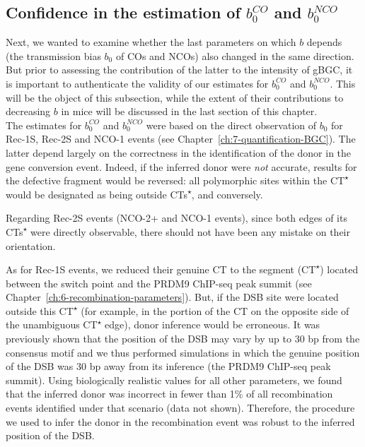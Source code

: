 \subsection{Confidence in the estimation of $b_{0}^{CO}$ and $b_{0}^{NCO}$}

Next, we wanted to examine whether the last parameters on which $b$ depends (the transmission bias $b_0$ of COs and NCOs) also changed in the same direction.
But prior to assessing the contribution of the latter to the intensity of gBGC, it is important to authenticate the validity of our estimates for $b_{0}^{CO}$ and $b_{0}^{NCO}$.
This will be the object of this subsection, while the extent of their contributions to decreasing $b$ in mice will be discussed in the last section of this chapter.\\

The estimates for $b_{0}^{CO}$ and $b_{0}^{NCO}$ were based on the direct observation of $b_0$ for Rec-1S, Rec-2S and NCO-1 events (see Chapter~\ref{ch:7-quantification-BGC}).
The latter depend largely on the correctness in the identification of the donor in the gene conversion event.
Indeed, if the inferred donor were \textit{not} accurate, results for the defective fragment would be reversed: all polymorphic sites within the CT\textsuperscript{$\star$} would be designated as being outside CTs\textsuperscript{$\star$}, and conversely.

Regarding Rec-2S events (NCO-2+ and NCO-1 events), since both edges of its CTs\textsuperscript{$\star$} were directly observable, there should not have been any mistake on their orientation.

%
As for Rec-1S events, we reduced their genuine CT to the segment (CT\textsuperscript{$\star$}) located between the switch point and the PRDM9 ChIP-seq peak summit (see Chapter~\ref{ch:6-recombination-parameters}).
But, if the DSB site were located outside this CT\textsuperscript{$\star$} (for example, in the portion of the CT on the opposite side of the unambiguous CT\textsuperscript{$\star$} edge), donor inference would be erroneous.
It was previously shown that the position of the DSB may vary by up to 30 bp from the consensus motif \citep{lange2016landscape} and we thus performed simulations in which the genuine position of the DSB was 30 bp away from its inference (the PRDM9 ChIP-seq peak summit).
Using biologically realistic values for all other parameters, we found that the inferred donor was incorrect in fewer than 1\% of all recombination events identified under that scenario (data not shown).
Therefore, the procedure we used to infer the donor in the recombination event was robust to the inferred position of the DSB\@.

